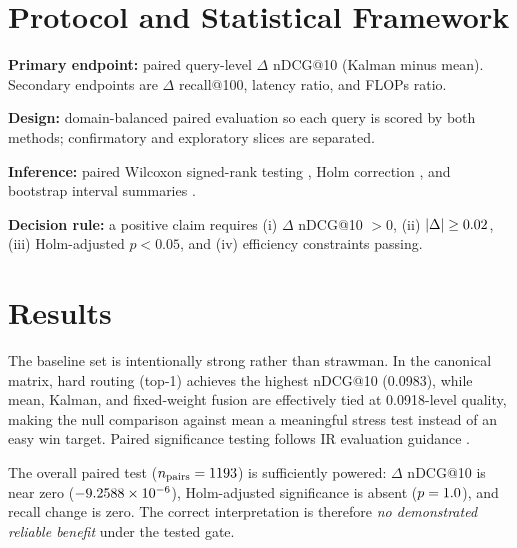 \documentclass[10pt]{article}
\begin{document}
\section{Protocol and Statistical Framework}
\textbf{Primary endpoint:} paired query-level $\Delta$ nDCG@10 (Kalman minus mean). Secondary endpoints are $\Delta$ recall@100, latency ratio, and FLOPs ratio.

\textbf{Design:} domain-balanced paired evaluation so each query is scored by both methods; confirmatory and exploratory slices are separated.

\textbf{Inference:} paired Wilcoxon signed-rank testing \cite{wilcoxon1945}, Holm correction \cite{holm1979}, and bootstrap interval summaries \cite{efron1979bootstrap}.

\textbf{Decision rule:} a positive claim requires (i) $\Delta$ nDCG@10 $>0$, (ii) $|\Delta|\ge 0.02$, (iii) Holm-adjusted $p<0.05$, and (iv) efficiency constraints passing.

\section{Results}

\begin{table}[t]
\centering
\caption{Concise baseline comparison from \texttt{\CanonicalBenchVersion} ($n=\ConfirmPairs$, domain-balanced, \texttt{max\_candidates}=\CandidateCap). Hard routing (top-1) is the best-performing single strategy; fusion-family variants (Mean, Kalman, fixed-weight) are tightly clustered.}
\label{tab:shared-baseline-matrix}

\end{table}


The baseline set is intentionally strong rather than strawman. In the canonical matrix, hard routing (top-1) achieves the highest nDCG@10 (0.0983), while mean, Kalman, and fixed-weight fusion are effectively tied at 0.0918-level quality, making the null comparison against mean a meaningful stress test instead of an easy win target. Paired significance testing follows IR evaluation guidance \cite{smucker2007comparison,demsar2006statistical}.

The overall paired test ($n_{\text{pairs}}=1193$) is sufficiently powered: $\Delta$ nDCG@10 is near zero (\(-9.2588\times10^{-6}\)), Holm-adjusted significance is absent (\(p=1.0\)), and recall change is zero. The correct interpretation is therefore \emph{no demonstrated reliable benefit} under the tested gate.
\end{document}
